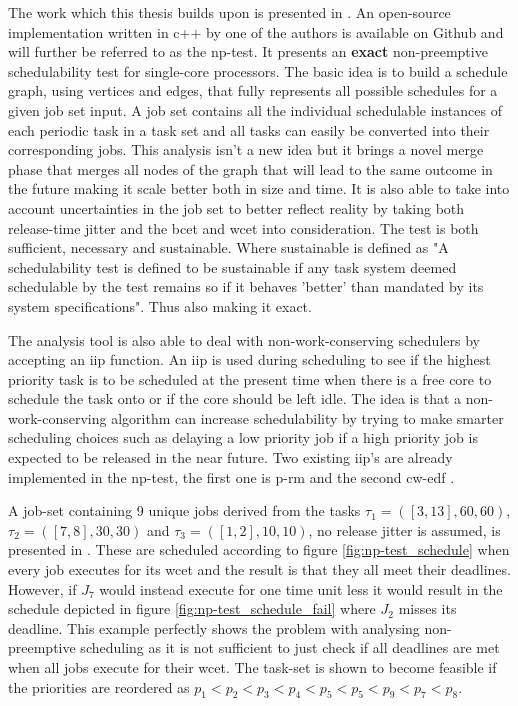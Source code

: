 \documentclass{kththesis}
\begin{document}
The work which this thesis builds upon is presented in \parencite{nasri_exact_2017}. An open-source
implementation written in c++ by one of the authors is available on
Github\parencite{brandenburg_implementation_2018} and will further be referred to as the
\acrfull{np}-test. It presents an \textbf{exact} non-preemptive schedulability test for single-core
processors. The basic idea is to build a schedule graph, using vertices and edges, that fully
represents all possible schedules for a given job set input. A job set contains all the individual
schedulable instances of each periodic task in a task set and all tasks can easily be converted into
their corresponding jobs. This analysis isn't a new idea but it brings a novel merge phase that
merges all nodes of the graph that will lead to the same outcome in the future making it scale better
both in size and time. It is also able to take into account uncertainties in the job set to better
reflect reality by taking both release-time jitter and the \acrshort{bcet} and \acrshort{wcet} into
consideration. The test is both sufficient, necessary and sustainable. Where sustainable is defined
as "A schedulability test is defined to be sustainable if any task system deemed schedulable by the
test remains so if it behaves 'better' than mandated by its system
specifications"\parencite{baruah_sustainable_2006}. Thus also making it exact.

The analysis tool is also able to deal with non-work-conserving schedulers by accepting an
\acrshort{iip} function. An \acrfull{iip} is used during scheduling to see if the highest priority
task is to be scheduled at the present time when there is a free core to schedule the task onto or
if the core should be left idle. The idea is that a non-work-conserving algorithm can increase
schedulability by trying to make smarter scheduling choices such as delaying a low priority job if a
high priority job is expected to be released in the near future. Two existing \acrshort{iip}'s are
already implemented in the \acrshort{np}-test, the first one is \acrfull{p-rm}
\parencite{nasri_precautious-rm:_2014} and the second \acrfull{cw-edf}
\parencite{nasri_non-work-conserving_2016}.

A job-set containing 9 unique jobs derived from the tasks $\tau_1=([3,13], 60, 60)$, $\tau_2=([7,
8], 30, 30)$ and $\tau_3=([1,2], 10, 10)$, no release jitter is assumed, is presented in
\parencite{nasri_exact_2017}. These are scheduled according to figure \ref{fig:np-test_schedule}
when every job executes for its \acrshort{wcet} and the result is that they all meet their
deadlines. However, if $J_7$ would instead execute for one time unit less it would result in the
schedule depicted in figure \ref{fig:np-test_schedule_fail} where $J_2$ misses its deadline. This
example perfectly shows the problem with analysing non-preemptive scheduling as it is not sufficient
to just check if all deadlines are met when all jobs execute for their \acrshort{wcet}. The task-set
is shown to become feasible if the priorities are reordered as $ p_1 < p_2 < p_3 < p_4 < p_5 < p_5 <
p_9 < p_7 < p_8$.
\end{document}
